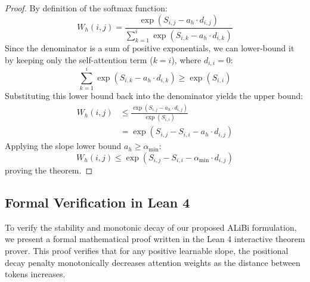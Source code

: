 \documentclass[11pt,journal,compsoc]{IEEEtran}
\begin{document}
\begin{proof}
By definition of the softmax function:
\begin{equation}
    W_{h}(i, j) = \frac{\exp(S_{i, j} - a_{h} \cdot d_{i, j})}{\sum_{k=1}^{i} \exp(S_{i, k} - a_{h} \cdot d_{i, k})}
\end{equation}
Since the denominator is a sum of positive exponentials, we can lower-bound it by keeping only the self-attention term ($k = i$), where $d_{i, i} = 0$:
\begin{equation}
    \sum_{k=1}^{i} \exp(S_{i, k} - a_{h} \cdot d_{i, k}) \ge \exp(S_{i, i})
\end{equation}
Substituting this lower bound back into the denominator yields the upper bound:
\begin{align}
    W_{h}(i, j) &\le \frac{\exp(S_{i, j} - a_{h} \cdot d_{i, j})}{\exp(S_{i, i})} \\
                &= \exp\left( S_{i, j} - S_{i, i} - a_{h} \cdot d_{i, j} \right)
\end{align}
Applying the slope lower bound $a_{h} \ge \alpha_{\text{min}}$:
\begin{equation}
    W_{h}(i, j) \le \exp\left( S_{i, j} - S_{i, i} - \alpha_{\text{min}} \cdot d_{i, j} \right)
\end{equation}
proving the theorem.
\end{proof}

\subsection{Formal Verification in Lean 4}
To verify the stability and monotonic decay of our proposed ALiBi formulation, we present a formal mathematical proof written in the Lean 4 interactive theorem prover. This proof verifies that for any positive learnable slope, the positional decay penalty monotonically decreases attention weights as the distance between tokens increases.
\end{document}

